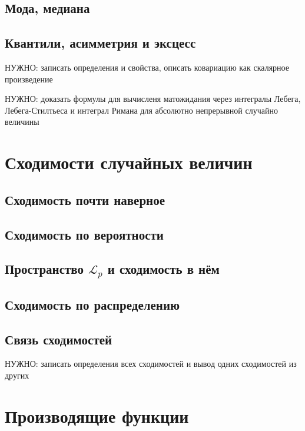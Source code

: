 \documentclass[12pt]{article}
\numberwithin{theorem}{section}
\theoremstyle{definition}
\newcommand{\TODO}[1]{\textcolor{todocolor}{НУЖНО: #1}}
\begin{document}
	\subsection{Мода, медиана}
	
	\subsection{Квантили, асимметрия и эксцесс}
	
	\TODO{записать определения и свойства, описать ковариацию как скалярное произведение}
	
	\TODO{доказать формулы для вычисленя матожидания через интегралы Лебега, Лебега-Стилтьеса и интеграл Римана для абсолютно непрерывной случайно величины}
	
	
	
	\section{Сходимости случайных величин}
	
	\subsection{Сходимость почти наверное}
	
	\subsection{Сходимость по вероятности}
	
	\subsection{Пространство $ \mathcal{L}_p $ и сходимость в нём}
	
	\subsection{Сходимость по распределению}
	
	\subsection{Связь сходимостей}
	
	\TODO{записать определения всех сходимостей и вывод одних сходимостей из других}
	
	\section{Производящие функции}
	
\end{document}
